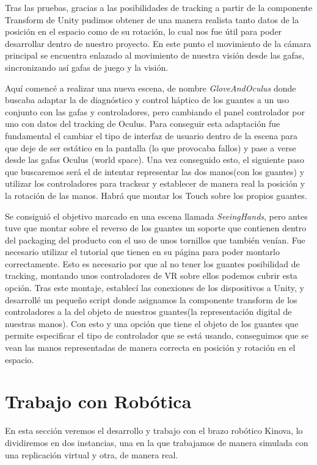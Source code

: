 Tras las pruebas, gracias a las posibilidades de tracking a partir de la componente Transform\cite{Transform} de Unity pudimos obtener de una manera realista tanto datos de la posición en el espacio como de su rotación, lo cual nos fue útil para poder desarrollar dentro de nuestro proyecto. En este punto el movimiento de la cámara principal se encuentra enlazado al movimiento de nuestra visión desde las gafas, sincronizando así gafas de juego y la visión.

Aquí comencé a realizar una nueva escena, de nombre \textit{GloveAndOculus} donde buscaba adaptar la de diagnóstico y control háptico de los guantes a un uso conjunto con las gafas y controladores, pero cambiando el panel controlador por uno con datos del tracking de Oculus. Para conseguir esta adaptación fue fundamental el cambiar el tipo de interfaz de usuario dentro de la escena para que deje de ser estático en la pantalla (lo que provocaba fallos) y pase a verse desde las gafas Oculus (world space). Una vez conseguido esto, el siguiente paso que buscaremos será el de intentar representar las dos manos(con los guantes) y utilizar los controladores para trackear y establecer de manera real la posición y la rotación de las manos. Habrá que montar los Touch sobre los propios guantes.

Se consiguió el objetivo marcado en una escena llamada \textit{SeeingHands}, pero antes tuve que montar sobre el reverso de los guantes un soporte que contienen dentro del packaging del producto con el uso de unos tornillos que también venían. Fue necesario utilizar el tutorial que tienen en su página para poder montarlo correctamente. Esto es necesario por que al no tener los guantes posibilidad de tracking, montando unos controladores de VR\cite{VR} sobre ellos podemos cubrir esta opción. Tras este montaje, establecí las conexiones de los dispositivos a Unity, y desarrollé un pequeño script donde asignamos la componente\cite{Componentes} transform de los controladores a la del objeto de nuestros guantes(la representación digital de nuestras manos). Con esto y una opción que tiene el objeto de los guantes que permite especificar el tipo de controlador que se está usando, conseguimos que se vean las manos representadas de manera correcta en posición y rotación en el espacio. 

\section{Trabajo con Robótica}
En esta sección veremos el desarrollo y trabajo con el brazo robótico Kinova, lo dividiremos en dos instancias, una en la que trabajamos de manera simulada con una replicación virtual y otra, de manera real.
